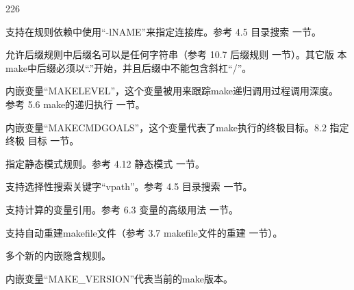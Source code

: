 \begin{dinglist}{226}
\item 支持在规则依赖中使用“-lNAME”来指定连接库。参考 4.5 目录搜索 一节。

\item 允许后缀规则中后缀名可以是任何字符串（参考 10.7 后缀规则 一节）。其它版
    本make中后缀必须以“.”开始，并且后缀中不能包含斜杠“/”。

\item 内嵌变量“MAKELEVEL”，这个变量被用来跟踪make递归调用过程调用深度。 参考
    5.6 make的递归执行 一节。

\item 内嵌变量“MAKECMDGOALS”，这个变量代表了make执行的终极目标。8.2 指定终极
    目标 一节。

\item 指定静态模式规则。参考 4.12 静态模式 一节。

\item 支持选择性搜索关键字“vpath”。参考 4.5 目录搜索 一节。

\item 支持计算的变量引用。参考 6.3 变量的高级用法 一节。

\item 支持自动重建makefile文件（参考 3.7 makefile文件的重建 一节）。

\item 多个新的内嵌隐含规则。

\item 内嵌变量“MAKE\_VERSION”代表当前的make版本。

\end{dinglist}

